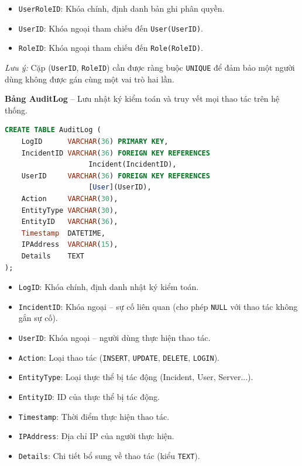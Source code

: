 \begin{itemize}[leftmargin=2em]
    \item \texttt{UserRoleID}: Khóa chính, định danh bản ghi phân quyền.
    \item \texttt{UserID}: Khóa ngoại tham chiếu đến \texttt{User(UserID)}.
    \item \texttt{RoleID}: Khóa ngoại tham chiếu đến \texttt{Role(RoleID)}.
\end{itemize}

\noindent\textit{Lưu ý:} Cặp (\texttt{UserID}, \texttt{RoleID}) cần được ràng buộc \texttt{UNIQUE} để đảm bảo một người dùng không được gán cùng một vai trò hai lần.

\vspace{0.5em}
\noindent\textbf{Bảng AuditLog} -- Lưu nhật ký kiểm toán và truy vết mọi thao tác trên hệ thống.

\begin{tcolorbox}[colback=gray!5, colframe=gray!60, title={\textbf{CREATE TABLE AuditLog}}, fonttitle=\bfseries\small, boxrule=0.5pt, arc=2pt]
\begin{lstlisting}[language=SQL, basicstyle=\ttfamily\small, breaklines=true, showstringspaces=false, keywordstyle=\bfseries\color{blue!70!black}, stringstyle=\color{red!70!black}, commentstyle=\itshape\color{green!50!black}]
CREATE TABLE AuditLog (
    LogID      VARCHAR(36) PRIMARY KEY,
    IncidentID VARCHAR(36) FOREIGN KEY REFERENCES
                    Incident(IncidentID),
    UserID     VARCHAR(36) FOREIGN KEY REFERENCES
                    [User](UserID),
    Action     VARCHAR(30),
    EntityType VARCHAR(30),
    EntityID   VARCHAR(36),
    Timestamp  DATETIME,
    IPAddress  VARCHAR(15),
    Details    TEXT
);
\end{lstlisting}
\end{tcolorbox}

\begin{itemize}[leftmargin=2em]
    \item \texttt{LogID}: Khóa chính, định danh nhật ký kiểm toán.
    \item \texttt{IncidentID}: Khóa ngoại -- sự cố liên quan (cho phép \texttt{NULL} với thao tác không gắn sự cố).
    \item \texttt{UserID}: Khóa ngoại -- người dùng thực hiện thao tác.
    \item \texttt{Action}: Loại thao tác (\texttt{INSERT}, \texttt{UPDATE}, \texttt{DELETE}, \texttt{LOGIN}).
    \item \texttt{EntityType}: Loại thực thể bị tác động (Incident, User, Server...).
    \item \texttt{EntityID}: ID của thực thể bị tác động.
    \item \texttt{Timestamp}: Thời điểm thực hiện thao tác.
    \item \texttt{IPAddress}: Địa chỉ IP của người thực hiện.
    \item \texttt{Details}: Chi tiết bổ sung về thao tác (kiểu \texttt{TEXT}).
\end{itemize}

